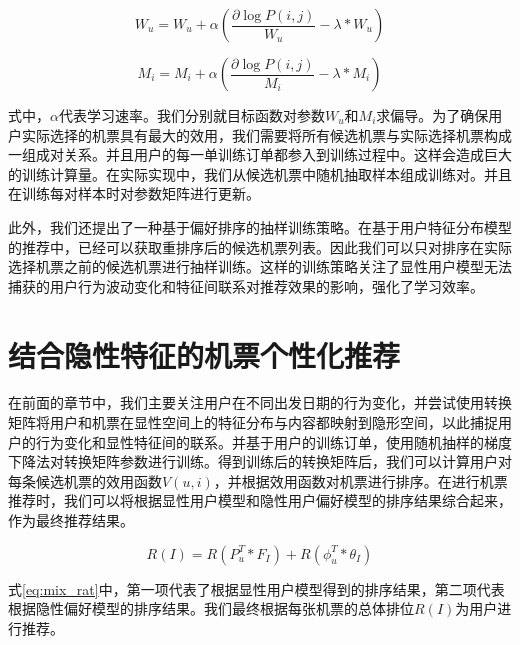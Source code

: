 \begin{equation}
	W_u = W_u + \alpha(\frac{\partial \log P(i,j)}{W_u} - \lambda*W_u)
\end{equation}

\begin{equation}
	M_i = M_i + \alpha(\frac{\partial \log P(i,j)}{M_i} - \lambda*M_i)
\end{equation}

式中，$\alpha$代表学习速率。我们分别就目标函数对参数$W_u$和$M_i$求偏导。为了确保用户实际选择的机票具有最大的效用，我们需要将所有候选机票与实际选择机票构成一组成对关系。并且用户的每一单训练订单都参入到训练过程中。这样会造成巨大的训练计算量。在实际实现中，我们从候选机票中随机抽取样本组成训练对。并且在训练每对样本时对参数矩阵进行更新。

此外，我们还提出了一种基于偏好排序的抽样训练策略。在基于用户特征分布模型的推荐中，已经可以获取重排序后的候选机票列表。因此我们可以只对排序在实际选择机票之前的候选机票进行抽样训练。这样的训练策略关注了显性用户模型无法捕获的用户行为波动变化和特征间联系对推荐效果的影响，强化了学习效率。

\section{结合隐性特征的机票个性化推荐}

在前面的章节中，我们主要关注用户在不同出发日期的行为变化，并尝试使用转换矩阵将用户和机票在显性空间上的特征分布与内容都映射到隐形空间，以此捕捉用户的行为变化和显性特征间的联系。并基于用户的训练订单，使用随机抽样的梯度下降法对转换矩阵参数进行训练。得到训练后的转换矩阵后，我们可以计算用户对每条候选机票的效用函数$V(u,i)$，并根据效用函数对机票进行排序。在进行机票推荐时，我们可以将根据显性用户模型和隐性用户偏好模型的排序结果综合起来，作为最终推荐结果。

\begin{equation}
\label{eq:mix_rat}
	R(I) = R(P_u^T * F_I) + R(\phi_u^T * \theta_I)
\end{equation}

式\ref{eq:mix_rat}中，第一项代表了根据显性用户模型得到的排序结果，第二项代表根据隐性偏好模型的排序结果。我们最终根据每张机票的总体排位$R(I)$为用户进行推荐。

